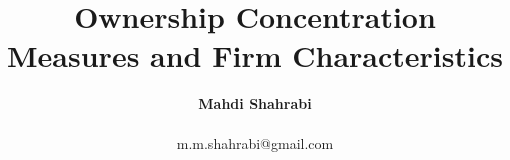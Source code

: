 \documentclass[12pt,letterpaper]{article}
\begin{document}
\title{Ownership Concentration Measures and Firm Characteristics}
\author{\Large\textbf{Mahdi Shahrabi} \\~\\m.m.shahrabi@gmail.com}
\maketitle

\newpage
\pagestyle{fancyplain}




	




\newpage

\begin{landscape}

\end{landscape}


\begin{landscape}
	
\end{landscape}


\begin{landscape}
	
\end{landscape}

\end{document}
